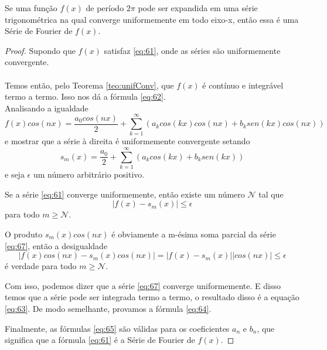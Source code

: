 \begin{teorema}
    Se uma função $f(x)$ de período $2\pi$ pode ser expandida
    em uma série trigonométrica na qual converge uniformemente 
    em todo eixo-x, então essa é uma Série de Fourier de $f(x)$.
\end{teorema}
\begin{proof}
    Supondo que $f(x)$ satisfaz \ref{eq:61}, onde as séries são
    uniformemente convergente. \\
    \\
    Temos então, pelo Teorema \ref{teo:unifConv}, que $f(x)$ é
    contínuo e integrável termo a termo. Isso nos dá a fórmula
    \ref{eq:62}.\\

    Analisando a igualdade
    \begin{equation}
        f(x)cos(nx) = \dfrac{a_0 cos(nx)}{2} + \sum\limits_{k=1}^{\infty}(a_kcos(kx)cos(nx) + b_ksen(kx)cos(nx))
    \label{eq:67}
    \end{equation} 
    e mostrar que a série à direita é uniformemente convergente setando
    \begin{equation}
        s_m(x) = \dfrac{a_0}{2} + \sum\limits_{k=1}^{\infty}(a_kcos(kx)+b_ksen(kx))
    \end{equation}
    e seja $\epsilon$ um número arbitrário positivo.

    Se a série \ref{eq:61} converge uniformemente, então existe
    um número $\mathcal{N}$ tal que 
    \begin{equation}
        |f(x) - s_m(x)| \leq \epsilon
    \end{equation}
    para todo $m \geq \mathcal{N}$. 

    O produto $s_m(x)cos(nx)$ é obviamente a m-ésima soma parcial
    da série \ref{eq:67}, então a desigualdade
    \begin{equation}
        |f(x)cos(nx) - s_m(x)cos(nx)| = |f(x) - s_m(x)||cos(nx)| \leq \epsilon
    \end{equation}
    é verdade para todo $m \geq \mathcal{N}$.

    Com isso, podemos dizer que a série \ref{eq:67} converge uniformemente.
    E disso temos que a série pode ser integrada termo a termo, o resultado
    disso é a equação \ref{eq:63}. De modo semelhante, provamos a fórmula
    \ref{eq:64}.

    Finalmente, as fórmulas \ref{eq:65} são válidas para os coeficientes $a_n$
    e $b_n$, que significa que a fórmula \ref{eq:61} é a Série de Fourier de $f(x)$.
\end{proof}